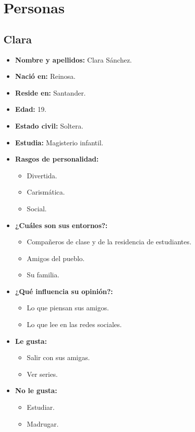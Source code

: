 \chapter{Personas}
\section{Clara}

\begin{itemize}
  \item \textbf{Nombre y apellidos: } Clara Sánchez.
  \item \textbf{Nació en: } Reinosa.
  \item \textbf{Reside en: } Santander.
  \item \textbf{Edad: } 19.
  \item \textbf{Estado civil: } Soltera.
  \item \textbf{Estudia: } Magisterio infantil.
  \item \textbf{Rasgos de personalidad: } 
  \begin{itemize}
    \item Divertida.
    \item Carismática.
    \item Social.
  \end{itemize}
  \item \textbf{¿Cuáles son sus entornos?: } 
  \begin{itemize}
    \item Compañeros de clase y de la residencia de estudiantes.
    \item Amigos del pueblo.
    \item Su familia.
  \end{itemize}
  \item \textbf{¿Qué influencia su opinión?: } 
  \begin{itemize}
    \item Lo que piensan sus amigos.
    \item Lo que lee en las redes sociales.
  \end{itemize}
  \item \textbf{Le gusta: } 
  \begin{itemize}
    \item Salir con sus amigas.
    \item Ver series.
  \end{itemize}
  \item \textbf{No le gusta: } 
  \begin{itemize}
    \item Estudiar.
    \item Madrugar.
  \end{itemize}
\end{itemize}

